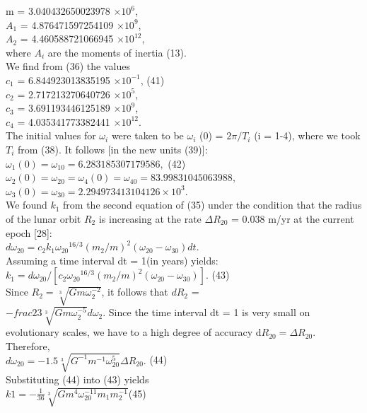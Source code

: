 \documentclass[fontsize = 11pt,a4paper]{article}
\begin{document}
\begin{multicols}{2}
m = 3.040432650023978  $\times  10^{6}$,\\
$A_1$ = 4.876471597254109  $\times  10^{9}$,\\
$A_2$ = 4.460588721066945 $\times 10^{12}$,\\
where $A_i$ are the moments of inertia (13).\\
We find from (36) the values\\
$c_1$ = 6.844923013835195 $\times {10}^{-1}$, \hfill (41) \\
$c_2$ = 2.717213270640726 $\times {10}^{5}$,\\
$c_3$ = 3.691193446125189 $\times {10}^{9}$,\\
$c_4$ = 4.035341773382441 $\times {10}^{12}$.\\
The initial values for $\omega_i$ were taken to be $\omega_i$ (0) =
$2\pi/T_i$ (i = 1-4), where we took $T_i$ from (38). It
follows [in the new units (39)]:\\
$\omega_1 (0) = \omega_{10} = 6.283185307179586,$ \hfill  (42)\\
$\omega_2 (0) = \omega_{20} = \omega_4 (0) = \omega_{40} = 83.99831045063988,$\\
$\omega_3 (0) = \omega_{30} = 2.294973413104126 \times 10^3.$\\
\indent We found $k_1$ from the second equation of (35)
under the condition that the radius of the lunar orbit
$R_2$ is increasing at the rate $\Delta R_{20}$ = 0.038 m/yr at the
current epoch [28]:\\
$d \omega_{20} = c_2 k _1 {\omega_{20}}^{16/3} {(m_2/m)}^2 (\omega_{20} - \omega_{30}) dt.$\\
Assuming a time interval dt = 1(in years) yields:\\
$k _1 = d \omega_{20}/ [c_2 {\omega_{20}}^{16/3} {(m_2/m)}^2 (\omega_{20} - \omega_{30})]. $ \hfill (43) \\
Since $R_2 = \sqrt[3]{Gm\omega^{-2}_2}$, it follows that $dR_2$ = \\
$- frac{2}{3}  \sqrt[3]{Gm\omega^{-5}_2}d \omega_2$. Since the time interval dt = 1 is
very small on evolutionary scales, we have to a high
degree of accuracy d$R_20 = \Delta R_20$. Therefore, \\
$d \omega_{20}  = -1.5  \sqrt[3]{G^{-1} m^{-1} \omega^{5}_{20}} \Delta R_{20}.$ \hfill (44) \\
Substituting (44) into (43) yields\\
$k1 = - \frac{1}{36}  \sqrt[3]{G m^4 \omega^{-11}_{20} m_1 m^{-1}_2}$\hfill (45) \\

\end{multicols}
\end{document}
